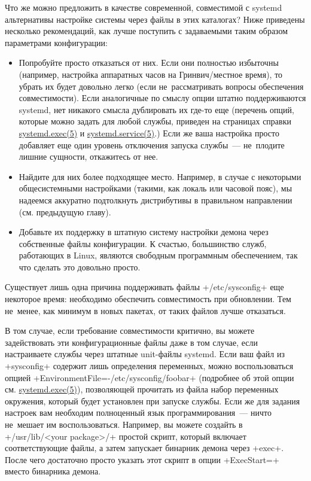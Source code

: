 \documentclass[10pt,oneside,a4paper]{article}
\begin{document}
Что же можно предложить в качестве современной, совместимой с systemd
альтернативы настройке системы через файлы в этих каталогах? Ниже приведены
несколько рекомендаций, как лучше поступить с задаваемыми таким образом параметрами
конфигурации:
\begin{itemize}
	\item Попробуйте просто отказаться от них. Если они полностью избыточны (например,
		настройка аппаратных часов на Гринвич/местное время), то убрать
		их будет довольно легко (если не~рассматривать вопросы
		обеспечения совместимости). Если аналогичные по смыслу опции
		штатно поддерживаются systemd, нет никакого смысла дублировать
		их где-то еще (перечень опций, которые можно задать для любой
		службы, приведен на страницах справки
		\href{http://0pointer.de/public/systemd-man/systemd.exec.html}{systemd.exec(5)}
		и
		\href{http://0pointer.de/public/systemd-man/systemd.service.html}{systemd.service(5)}.)
		Если же ваша настройка просто добавляет еще один уровень
		отключения запуска службы~--- не~плодите лишние сущности,
		откажитесь от нее.
	\item Найдите для них более подходящее место. Например, в случае с
		некоторыми общесистемными настройками (такими, как локаль или
		часовой пояс), мы надеемся аккуратно подтолкнуть дистрибутивы в
		правильном направлении (см. предыдущую главу).
	\item Добавьте их поддержку в штатную систему настройки демона через
		собственные файлы конфигурации. К счастью, большинство служб,
		работающих в Linux, являются свободным программным обеспечением,
		так что сделать это довольно просто.
\end{itemize}

Существует лишь одна причина поддерживать файлы +/etc/sysconfig+ еще некоторое
время: необходимо обеспечить совместимость при обновлении. Тем не~менее, как
минимум в новых пакетах, от таких файлов лучше отказаться.

В том случае, если требование совместимости критично, вы можете задействовать
эти конфигурационные файлы даже в том случае, если настраиваете службы через
штатные unit-файлы systemd. Если ваш файл из +sysconfig+ содержит лишь
определения переменных, можно воспользоваться опцией
+EnvironmentFile=-/etc/sysconfig/foobar+ (подробнее об этой опции см.
\href{http://0pointer.de/public/systemd-man/systemd.exec.html}{systemd.exec(5)}),
позволяющей прочитать из файла набор переменных окружения, который будет
установлен при запуске службы. Если же для задания настроек вам необходим
полноценный язык программирования~--- ничто не~мешает им воспользоваться.
Например, вы можете создайть в +/usr/lib/<your package>/+ простой скрипт,
который включает соответствующие файлы, а затем запускает бинарник демона через
+exec+. После чего достаточно просто указать этот скрипт в опции +ExecStart=+
вместо бинарника демона.
\end{document}
